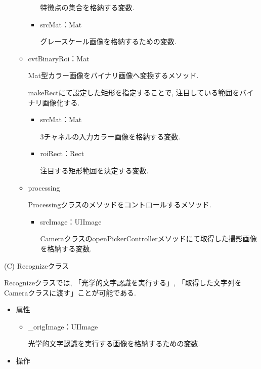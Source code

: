 \begin{description}
\begin{itemize}
\begin{itemize}
\begin{itemize}
特徴点の集合を格納する変数.

\item srcMat：Mat

グレースケール画像を格納するための変数.
\end{itemize}

\item cvtBinaryRoi：Mat

Mat型カラー画像をバイナリ画像へ変換するメソッド.

makeRectにて設定した矩形を指定することで, 注目している範囲をバイナリ画像化する.

\begin{itemize}
\item srcMat：Mat

3チャネルの入力カラー画像を格納する変数.

\item roiRect：Rect

注目する矩形範囲を決定する変数.
\end{itemize}

\item processing

Processingクラスのメソッドをコントロールするメソッド.

\begin{itemize}
\item srcImage：UIImage

CameraクラスのopenPickerControllerメソッドにて取得した撮影画像を格納する変数.
\end{itemize}

\end{itemize}

\end{itemize}

\item (C) Recognizeクラス

Recognizeクラスでは, 「光学的文字認識を実行する」, 「取得した文字列をCameraクラスに渡す」ことが可能である.

\begin{itemize}
\item 属性

\begin{itemize}
\item \_origImage：UIImage

光学的文字認識を実行する画像を格納するための変数.
\end{itemize}

\item 操作


\end{itemize}
\end{description}
